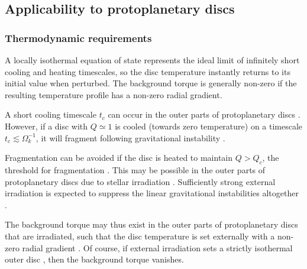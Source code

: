 {\bf
  \subsection{Applicability to protoplanetary discs}
  
  \subsubsection{Thermodynamic requirements}  

  A locally isothermal equation of state represents the ideal limit
  of infinitely short cooling and heating timescales, so the 
  disc temperature instantly returns to its initial value when 
  perturbed. The background torque is generally non-zero if the 
  resulting temperature profile has a non-zero radial gradient.  
  
  A short cooling timescale $t_c$ can occur in the outer
  parts of protoplanetary discs 
  \citep{rafikov05,clarke09,rice09,cossins10b,tsukamoto15}.  %
  However, if a disc with $Q\simeq 1$ is cooled (towards zero
  temperature) on a timescale $t_c\lesssim\Omega_k^{-1}$, it will
  fragment following gravitational instability
  \citep{gammie01,rice05,paardekooper12}.  
  
  Fragmentation can be avoided if the disc is heated to maintain 
  $Q>Q_c$, the threshold for fragmentation \citep[$Q_c\simeq
  1.4$ for isothermal discs,][]{mayer04}. This may be 
  possible in the outer parts of protoplanetary discs due to
  stellar irradiation \citep{rafikov09,kratter11,zhu12}. Sufficiently strong
  external irradiation is expected to suppress the linear gravitational
  instabilities altogether \citep{rice11}.  

  The background torque may thus exist in the outer
  parts of protoplanetary discs that are irradiated, such
  that the disc temperature is set externally with a non-zero radial
  gradient \citep[e.g.][]{stamatellos08}. Of course, if external irradiation sets a strictly
  isothermal outer disc \citep[e.g.][]{boley09}, then the background
  torque vanishes.      

}
